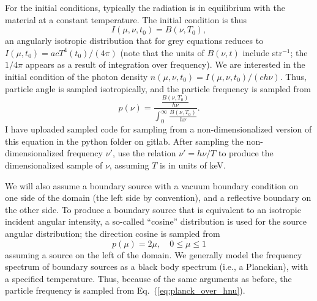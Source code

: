 \documentclass{article}
\renewcommand{\eqref}[1]{(\ref{#1})}
\newcommand{\ds}[0]{\displaystyle}
\begin{document}
For the initial conditions, typically the radiation is in
equilibrium with the material at a constant temperature.
The initial condition is thus 
\begin{equation}
  I(\mu,\nu,t_0) =  B(\nu,T_0),
\end{equation}
an angularly isotropic distribution that for grey equations reduces to $I(\mu,t_0) =
acT^4(t_0)/(4\pi)$ (note that the units of $B(\nu,t)$ include str$^{-1}$; the $1/4\pi$
appears as a result of integration over frequency).  We
are interested in the initial condition of the photon density $n(\mu,\nu,t_0)=
I(\mu,\nu,t_0)/(ch\nu)$.
Thus, particle angle is sampled isotropically, and the particle frequency is sampled
from
\begin{equation}
 \label{eq:planck_over_hnu}
  p(\nu) = \frac{\ds \frac{B(\nu,T_0)}{h\nu}}{\int_{0}^\infty\ds
\frac{B(\nu,T_0)}{h\nu}}.
\end{equation}
I have uploaded sampled code for sampling from a non-dimensionalized version of this
equation in the python folder on gitlab.  After sampling the non-dimensionalized
frequency $\nu'$, use the relation $\nu'=h\nu/T$ to produce the dimensionalized
sample of $\nu$, assuming $T$ is in units of keV.

We will also assume a boundary source with a vacuum boundary condition on one
side of the domain (the left side by convention), and a reflective boundary on
the other side.  To produce a boundary source that is equivalent to an isotropic
incident angular intensity, a so-called ``cosine'' distribution is used for the
source angular distribution; the direction cosine is sampled from
    \begin{equation}
      p(\mu) = 2\mu, \quad 0\leq\mu\leq 1
    \end{equation}
assuming a source on the left of the domain.  We generally model the frequency
spectrum of boundary sources as a black body spectrum (i.e., a Planckian), with a
specified temperature.  Thus, because of the same arguments as before, the particle frequency is sampled from
Eq.~\eqref{eq:planck_over_hnu}.  
\end{document}
